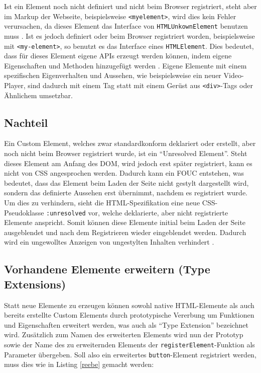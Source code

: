 Ist ein Element noch nicht definiert und nicht beim Browser registriert, steht aber im Markup der Webseite, beispielsweise \texttt{\textless{}myelement\textgreater{}}, wird dies kein Fehler verursachen, da dieses Element das Interface von \texttt{HTMLUnkownElement} benutzen muss \cite{citeulike:13851253}. Ist es jedoch definiert oder beim Browser registriert worden, beispielsweise mit \texttt{\textless{}my-element\textgreater{}}, so benutzt es das Interface eines \texttt{HTMLElement}. Dies bedeutet, dass für dieses Element eigene \ac{API}s erzeugt werden können, indem eigene Eigenschaften und Methoden hinzugefügt werden \cite{citeulike:13844982}. Eigene Elemente mit einem spezifischen Eigenverhalten und Aussehen, wie beispielsweise ein neuer Video-Player, sind dadurch mit einem Tag statt mit einem Gerüst aus \texttt{\textless{}div\textgreater{}}-Tags oder Ähnlichem umsetzbar.


\subsection{Nachteil}\label{nachteile-von-custom-elements}

Ein Custom Element, welches zwar standardkonform deklariert oder erstellt, aber noch nicht beim Browser registriert wurde, ist ein ``Unresolved Element''. Steht dieses Element am Anfang des \ac{DOM}, wird jedoch erst später registriert, kann es nicht von \ac{CSS} angesprochen werden. Dadurch kann ein \ac{FOUC} entstehen, was bedeutet, dass das Element beim Laden der Seite nicht gestylt dargestellt wird, sondern das definierte Aussehen erst übernimmt, nachdem es registriert wurde. Um dies zu verhindern, sieht die \ac{HTML}-Spezifikation eine neue \ac{CSS}-Pseudoklasse \texttt{:unresolved} vor, welche deklarierte, aber nicht registrierte Elemente anspricht. Somit können diese Elemente initial beim Laden der Seite ausgeblendet und nach dem Registrieren wieder eingeblendet werden. Dadurch wird ein ungewolltes Anzeigen von ungestylten Inhalten verhindert \cite{citeulike:13844984}.


\subsection{Vorhandene Elemente erweitern (Type Extensions)}\label{vorhandene-elemente-erweitern-type-extensions}

Statt neue Elemente zu erzeugen können sowohl native \ac{HTML}-Elemente als auch bereits erstellte Custom Elements durch prototypische Vererbung um Funktionen und Eigenschaften erweitert werden, was auch als ``Type Extension'' bezeichnet wird. Zusätzlich zum Namen des erweiterten Elements wird nun der Prototyp sowie der Name des zu erweiternden Elements der \texttt{registerElement}-Funktion als Parameter übergeben. Soll also ein erweitertes \texttt{button}-Element registriert werden, muss dies wie in Listing \ref{reebe} gemacht werden:

